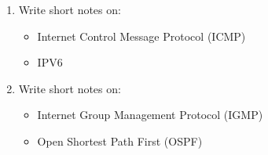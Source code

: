 \documentclass{article}
\begin{document}
\begin{enumerate}
\begin{itemize}
    \end{itemize}
    \item Write short notes on:
    \begin{itemize}
        \item Internet Control Message Protocol (ICMP)
        \item IPV6
    \end{itemize}
    \item Write short notes on:
    \begin{itemize}
        \item Internet Group Management Protocol (IGMP)
        \item Open Shortest Path First (OSPF)
    \end{itemize}
\end{enumerate}
\end{document}
